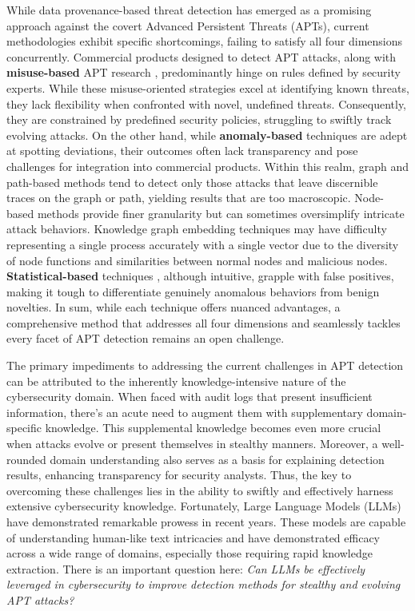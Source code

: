 While data provenance-based threat detection has emerged as a promising approach against the covert Advanced Persistent Threats (APTs), current methodologies exhibit specific shortcomings, failing to satisfy all four dimensions concurrently.
Commercial products designed to detect APT attacks, along with \textbf{misuse-based} APT research \cite{milajerdi2019holmes,milajerdi2019poirot,hossain2020combating}, predominantly hinge on rules defined by security experts. While these misuse-oriented strategies excel at identifying known threats, they lack flexibility when confronted with novel, undefined threats. Consequently, they are constrained by predefined security policies, struggling to swiftly track evolving attacks.
On the other hand, while \textbf{anomaly-based} techniques \cite{wang2022threatrace,han2020unicorn,wang2020you} are adept at spotting deviations, their outcomes often lack transparency and pose challenges for integration into commercial products. Within this realm, graph \cite{manzoor2016fast,han2020unicorn,li2021hierarchical,yang2023prographer,cheng2023kairos} and path-based methods \cite{wang2020you,alsaheel2021atlas} tend to detect only those attacks that leave discernible traces on the graph or path, yielding results that are too macroscopic. Node-based methods provide finer granularity but can sometimes oversimplify intricate attack behaviors. 
Knowledge graph embedding techniques\cite{zeng2021watson,zengy2022shadewatcher} may have difficulty representing a single process accurately with a single vector due to the diversity of node functions and similarities between normal nodes and malicious nodes.
\textbf{Statistical-based} techniques \cite{liu2018towards,hassan2019nodoze,hassan2020we}, although intuitive, grapple with false positives, making it tough to differentiate genuinely anomalous behaviors from benign novelties. 
In sum, while each technique offers nuanced advantages, a comprehensive method that addresses all four dimensions and seamlessly tackles every facet of APT detection remains an open challenge.


The primary impediments to addressing the current challenges in APT detection can be attributed to the inherently knowledge-intensive nature of the cybersecurity domain. When faced with audit logs that present insufficient information, there's an acute need to augment them with supplementary domain-specific knowledge. This supplemental knowledge becomes even more crucial when attacks evolve or present themselves in stealthy manners. Moreover, a well-rounded domain understanding also serves as a basis for explaining detection results, enhancing transparency for security analysts. Thus, the key to overcoming these challenges lies in the ability to swiftly and effectively harness extensive cybersecurity knowledge.
Fortunately, Large Language Models (LLMs) have demonstrated remarkable prowess in recent years. These models are capable of understanding human-like text intricacies and have demonstrated efficacy across a wide range of domains, especially those requiring rapid knowledge extraction. There is an important question here: \textit{Can LLMs be effectively leveraged in cybersecurity to improve detection methods for stealthy and evolving APT attacks?}

